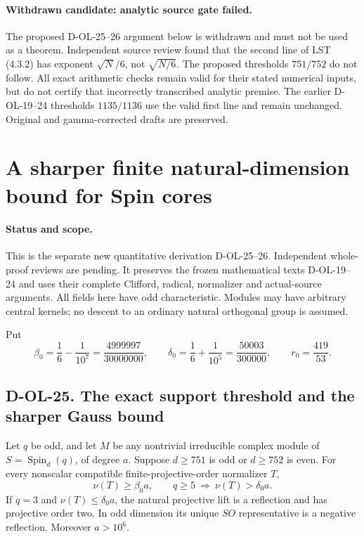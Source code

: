 \paragraph{Withdrawn candidate: analytic source gate failed.}
The proposed D-OL-25--26 argument below is withdrawn and must not be
used as a theorem. Independent source review found that the second
line of LST (4.3.2) has exponent $\sqrt N/6$, not $\sqrt{N/6}$.
The proposed thresholds $751/752$ do not follow. All exact arithmetic
checks remain valid for their stated numerical inputs, but do not
certify that incorrectly transcribed analytic premise. The earlier
D-OL-19--24 thresholds $1135/1136$ use the valid first line and remain
unchanged. Original and gamma-corrected drafts are preserved.

\section{A sharper finite natural-dimension bound for Spin cores}
\label{sec:spin-sharpened}

\paragraph{Status and scope.}
This is the separate new quantitative derivation D-OL-25--26.
Independent whole-proof reviews are pending.  It preserves the
frozen mathematical texts D-OL-19--24 and uses their complete
Clifford, radical, normalizer and actual-source arguments.
All fields here have odd characteristic.  Modules may have
arbitrary central kernels; no descent to an ordinary natural
orthogonal group is assumed.

Put
\[
 \beta_0=\frac16-\frac1{10^7}
         =\frac{4999997}{30000000},\qquad
 \delta_0=\frac16+\frac1{10^5}
         =\frac{50003}{300000},\qquad r_0=\frac{419}{53}.
 \tag{SSP.1}
\]

\subsection*{D-OL-25. The exact support threshold and the sharper Gauss bound}

\begin{lemma}[D-OL-25]
Let $q$ be odd, and let $M$ be any nontrivial irreducible complex
module of $S=\operatorname{Spin}_d(q)$, of degree $a$.
Suppose $d\ge751$ is odd or $d\ge752$ is even.
For every nonscalar compatible finite-projective-order normalizer $T$,
\[
 \nu(T)\ge\beta_0a,
 \qquad q\ge5\ \Longrightarrow\ \nu(T)>\delta_0a.
 \tag{SSP.2}
\]
If $q=3$ and $\nu(T)\le\delta_0a$, the natural projective
lift is a reflection and has projective order two.
In odd dimension its unique $SO$ representative is a negative
reflection.  Moreover $a>10^6$.
\end{lemma}

